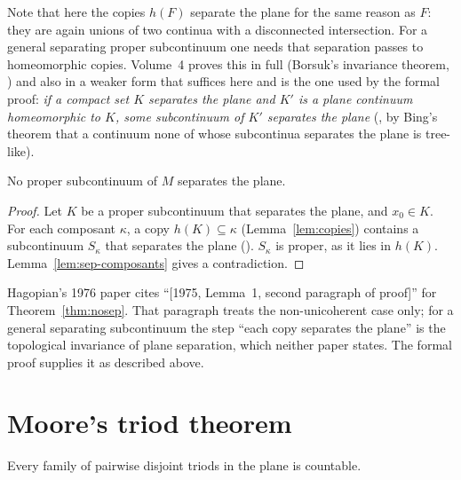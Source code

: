 
Note that here the copies $h(F)$ separate the plane for the same reason as $F$: they are again unions of
two continua with a disconnected intersection. For a general separating proper subcontinuum one needs that
separation passes to homeomorphic copies. Volume~4 proves this in full (Borsuk's invariance theorem,
) and also in a weaker form that suffices here and is the one used by the formal
proof: \emph{if a compact set $K$ separates the plane and $K'$ is a plane continuum homeomorphic to $K$,
some subcontinuum of $K'$ separates the plane} (, by Bing's theorem that a continuum
none of whose subcontinua separates the plane is tree-like).

\begin{theorem}[Hagopian 1976, p.~344]\label{thm:nosep}
No proper subcontinuum of $M$ separates the plane.
\end{theorem}

\begin{proof}
Let $K$ be a proper subcontinuum that separates the plane, and $x_0\in K$. For each composant $\kappa$, a
copy $h(K)\subseteq\kappa$ (Lemma~\ref{lem:copies}) contains a subcontinuum $S_\kappa$ that separates the plane
(). $S_\kappa$ is proper, as it lies in $h(K)$. Lemma~\ref{lem:sep-composants} gives a
contradiction.
\end{proof}


\begin{remark}
Hagopian's 1976 paper cites ``[1975, Lemma~1, second paragraph of proof]'' for Theorem~\ref{thm:nosep}.
That paragraph treats the non-unicoherent case only; for a general separating subcontinuum the step
``each copy separates the plane'' is the topological invariance of plane separation, which neither paper
states. The formal proof supplies it as described above.
\end{remark}

\section{Moore's triod theorem}

\begin{theorem}\label{thm:moore-triod}
Every family of pairwise disjoint triods in the plane is countable.
\end{theorem}

